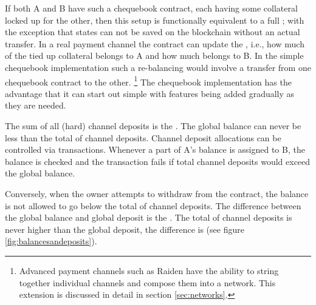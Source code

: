 If both A and B have such a chequebook contract, each having some collateral locked up for the other, then this setup is functionally equivalent to a full ; with the exception that states can not be saved on the blockchain without an actual transfer. In a real payment channel the contract can update the , i.e., how much of the tied up collateral belongs to A and how much belongs to B. In the simple chequebook implementation such a re-balancing would involve a transfer from one chequebook contract to the other.%
%
\footnote{Advanced payment channels such as Raiden \cite{citation-needed:Raiden} have the ability to string together individual channels and compose them into a network. This extension is discussed in detail in section \ref{sec:networks}.}
%
The chequebook implementation has the advantage that it can start out simple with features being added gradually as they are needed.

The sum of all (hard) channel deposits is the . The global balance can never be less than the total of channel deposits. Channel deposit allocations can be controlled via transactions. Whenever a part of A's balance is assigned to B, the balance is checked and the transaction fails if total channel deposits would exceed the global balance.

Conversely, when the owner attempts to withdraw from the contract, the balance is not allowed to go below the total of channel deposits. 
The difference between the global balance and global deposit is the . The total of channel deposits is never higher than the global deposit, the difference is  (see figure \ref{fig:balancesandeposits}).

